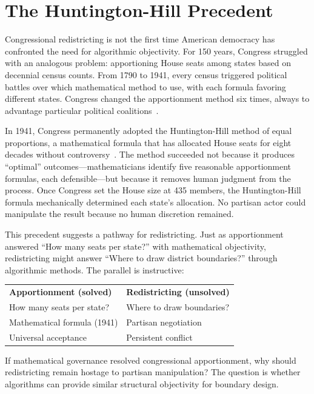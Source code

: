 \section{The Huntington-Hill Precedent}

Congressional redistricting is not the first time American democracy has confronted the need for algorithmic objectivity. For 150 years, Congress struggled with an analogous problem: apportioning House seats among states based on decennial census counts. From 1790 to 1941, every census triggered political battles over which mathematical method to use, with each formula favoring different states. Congress changed the apportionment method six times, always to advantage particular political coalitions~\cite{balinski1982fair}.

In 1941, Congress permanently adopted the Huntington-Hill method of equal proportions, a mathematical formula that has allocated House seats for eight decades without controversy~\cite{huntington1928methods}. The method succeeded not because it produces ``optimal'' outcomes---mathematicians identify five reasonable apportionment formulas, each defensible---but because it removes human judgment from the process. Once Congress set the House size at 435 members, the Huntington-Hill formula mechanically determined each state's allocation. No partisan actor could manipulate the result because no human discretion remained.

This precedent suggests a pathway for redistricting. Just as apportionment answered ``How many seats per state?'' with mathematical objectivity, redistricting might answer ``Where to draw district boundaries?'' through algorithmic methods. The parallel is instructive:

\begin{center}
\begin{tabular}{ll}
\textbf{Apportionment (solved)} & \textbf{Redistricting (unsolved)} \\
How many seats per state? & Where to draw boundaries? \\
Mathematical formula (1941) & Partisan negotiation \\
Universal acceptance & Persistent conflict \\
\end{tabular}
\end{center}

If mathematical governance resolved congressional apportionment, why should redistricting remain hostage to partisan manipulation? The question is whether algorithms can provide similar structural objectivity for boundary design.
